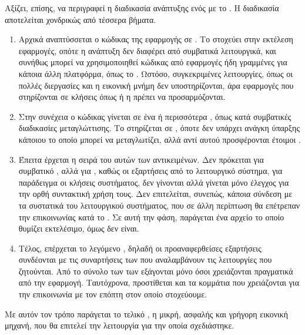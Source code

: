 Αξίζει, επίσης, να περιγραφεί η διαδικασία ανάπτυξης ενός  με
το . Η διαδικασία αποτελείται χονδρικώς από τέσσερα βήματα.
\begin{enumerate}
  \item Αρχικά αναπτύσσεται ο κώδικας της εφαρμογής σε
  . Το  στοχεύει στην εκτέλεση 
  εφαρμογές, οπότε η ανάπτυξη δεν διαφέρει από συμβατικά
  λειτουργικά, και συνήθως μπορεί να χρησιμοποιηθεί κώδικας
  από εφαρμογές ήδη γραμμένες για κάποια άλλη πλατφόρμα,
  όπως το . Ωστόσο, συγκεκριμένες λειτουργίες, όπως οι
  πολλές διεργασίες και η εικονική μνήμη δεν υποστηρίζονται,
  άρα εφαρμογές που στηρίζονται σε κλήσεις όπως  ή
  η  πρέπει να προσαρμόζονται.

  \item Στην συνέχεια ο κώδικας γίνεται  σε
  ένα ή περισσότερα , όπως κατά συμβατικές
  διαδικασίες μεταγλώττισης. Το  στηρίζεται σε
  , όποτε δεν υπάρχει ανάγκη ύπαρξης
  κάποιου  το οποίο μπορεί να μεταγλωτίζει, αλλά
  αντί αυτού προσφέρονται έτοιμοι .

  \item Έπειτα έρχεται η σειρά του  αυτών των
  αντικειμένων. Δεν πρόκειται για συμβατικό ,
  αλλά για , καθώς οι εξαρτήσεις από το
  λειτουργικό σύστημα, για παράδειγμα οι κλήσεις συστήματος,
  δεν γίνονται  αλλά γίνεται μόνο έλεγχος για την
  ορθή συντακτική χρήση τους. Δεν επιτελείται, συνεπώς,
  κάποια σύνδεση με τα συστατικά του λειτουργικού συστήματος,
  που σε άλλη περίπτωση θα επέτρεπαν την επικοινωνίας κατά το
  . Σε αυτή την φάση, παράγεται ένα αρχείο το οποίο
  θυμίζει εκτελέσιμο, όμως δεν είναι.

  \item Τέλος, επέρχεται το λεγόμενο , δηλαδή οι
  προαναφερθείσες εξαρτήσεις συνδέονται με τις συναρτήσεις
  των  που αναλαμβάνουν τις λειτουργίες που
  ζητούνται. Από το σύνολο των  των  εξάγονται
  μόνο όσοι χρειάζονται πραγματικά από την εφαρμογή. Ταυτόχρονα,
  προστίθεται και τα κομμάτια που χρειάζονται για την επικοινωνία
  με τον επόπτη στον οποίο στοχεύουμε.
\end{enumerate}
Με αυτόν τον τρόπο παράγεται το τελικό , η μικρή, ασφαλής
και γρήγορη εικονική μηχανή, που θα επιτελεί την λειτουργία για την
οποία σχεδιάστηκε.

